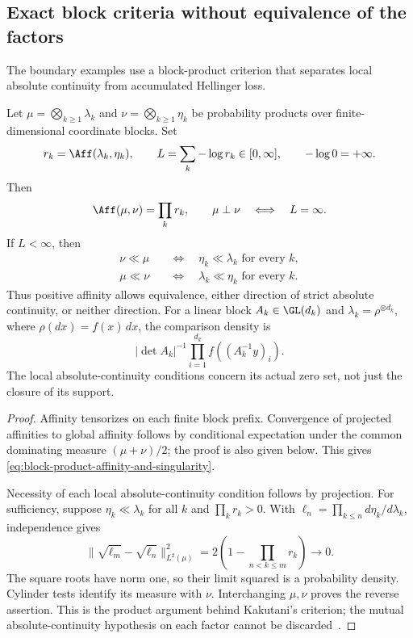 \subsection{Exact block criteria without equivalence of the factors}
\label{sec:block-products-without-factor-equivalence}

The boundary examples use a block-product criterion that separates local
absolute continuity from accumulated Hellinger loss.

\begin{theorem}
\label{thm:block-kakutani}
Let \(\mu=\bigotimes_{k\geq1}\lambda_k\) and
\(\nu=\bigotimes_{k\geq1}\eta_k\) be probability products over
finite-dimensional coordinate blocks.
Set
\[
 r_k=\Aff(\lambda_k,\eta_k),\qquad
 L=\sum_k-\log r_k\in[0,\infty],
 \qquad -\log0=+\infty.
\]
Then
\begin{equation}
 \Aff(\mu,\nu)=\prod_kr_k,\qquad
 \mu\perp\nu\quad\Longleftrightarrow\quad L=\infty.
 \label{eq:block-product-affinity-and-singularity}
\end{equation}
If \(L<\infty\), then
\begin{equation}
 \begin{aligned}
  \nu\ll\mu&\quad\Longleftrightarrow\quad
                         \eta_k\ll\lambda_k\text{ for every }k,\\
  \mu\ll\nu&\quad\Longleftrightarrow\quad
                         \lambda_k\ll\eta_k\text{ for every }k.
 \end{aligned}
 \label{eq:block-product-absolute-continuity}
\end{equation}
Thus positive affinity allows equivalence, either direction of strict
absolute continuity, or neither direction.
For a linear block \(A_k\in\GL(d_k)\) and
\(\lambda_k=\rho^{\otimes d_k}\), where \(\rho(dx)=f(x)\,dx\),
the comparison density is
\[
 |\det A_k|^{-1}\prod_{i=1}^{d_k}
                         f((A_k^{-1}y)_i).
\]
The local absolute-continuity conditions concern its actual zero
set, not just the closure of its support.
\end{theorem}
\begin{proof}
Affinity tensorizes on each finite block prefix.
Convergence of projected affinities to global affinity follows by
conditional expectation under the common dominating measure
\((\mu+\nu)/2\); the proof is also given below.
This gives \eqref{eq:block-product-affinity-and-singularity}.

Necessity of each local absolute-continuity condition follows by
projection.
For sufficiency, suppose \(\eta_k\ll\lambda_k\) for all \(k\) and
\(\prod_kr_k>0\).
With \(\ell_n=\prod_{k\leq n}d\eta_k/d\lambda_k\), independence gives
\[
 \|\sqrt{\ell_m}-\sqrt{\ell_n}\|_{L^2(\mu)}^2
       =2\left(1-\prod_{n<k\leq m}r_k\right)\longrightarrow0.
\]
The square roots have norm one, so their limit squared is a
probability density.
Cylinder tests identify its measure with \(\nu\).
Interchanging \(\mu,\nu\) proves the reverse assertion.
This is the product argument behind Kakutani's criterion; the
mutual absolute-continuity hypothesis on each factor cannot be
discarded~\cite{kakutani1948equivalence,shepp1965translate}.
\end{proof}

